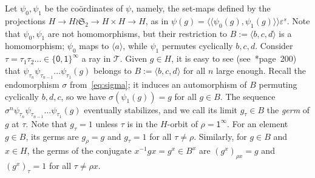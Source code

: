\documentclass{amsart}
\def\pair<#1>{{\langle\!\langle}#1{\rangle\!\rangle}}
\theoremstyle{definition}
\begin{document}
Let $\psi_0,\psi_1$ be the co\"ordinates of $\psi$, namely, the
set-maps defined by the projections $H\to H\wr\mathfrak S_2\to H\times
H\to H$, as in $\psi(g)=\pair<\psi_0(g),\psi_1(g)>\varepsilon^s$. Note
that $\psi_0,\psi_1$ are not homomorphisms, but their restriction to
$B:=\langle b,c,d\rangle$ is a homomorphism; $\psi_0$ maps to $\langle
a\rangle$, while $\psi_1$ permutes cyclically $b,c,d$. Consider
$\tau=\tau_1\tau_2\dots\in\{\mathsf0,\mathsf1\}^\infty$ a ray in
$\mathcal T$. Given $g\in H$, it is easy to see
(see~\cite{grigorchuk:pgps}*{page~200}) that
$\psi_{\tau_n}\psi_{\tau_{n-1}}\dots\psi_{\tau_1}(g)$ belongs to
$B:=\langle b,c,d\rangle$ for all $n$ large enough. Recall the
endomorphism $\sigma$ from~\eqref{eq:sigma}; it induces an
automorphism of $B$ permuting cyclically $b,d,c$, so we have
$\sigma(\psi_1(g))=g$ for all $g\in B$. The sequence
$\sigma^n\psi_{\tau_n}\psi_{\tau_{n-1}}\dots\psi_{\tau_1}(g)$
eventually stabilizes, and we call its limit $g_\tau\in B$ the
\emph{germ} of $g$ at $\tau$. Note that $g_\tau=1$ unless $\tau$ is in
the $H$-orbit of $\rho=\mathsf1^\infty$. For an element $g\in B$, its
germs are $g_\rho=g$ and $g_\tau=1$ for all $\tau\neq\rho$. Similarly,
for $g\in B$ and $x\in H$, the germs of the conjugate $x^{-1}gx=g^x\in
B^x$ are $(g^x)_{\rho x}=g$ and $(g^x)_\tau=1$ for all $\tau\neq\rho
x$.
\end{document}
